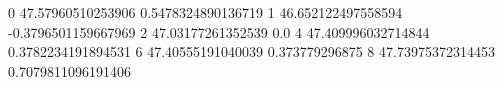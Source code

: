 0 47.57960510253906 0.5478324890136719
1 46.652122497558594 -0.3796501159667969
2 47.03177261352539 0.0
4 47.409996032714844 0.3782234191894531
6 47.40555191040039 0.373779296875
8 47.73975372314453 0.7079811096191406
